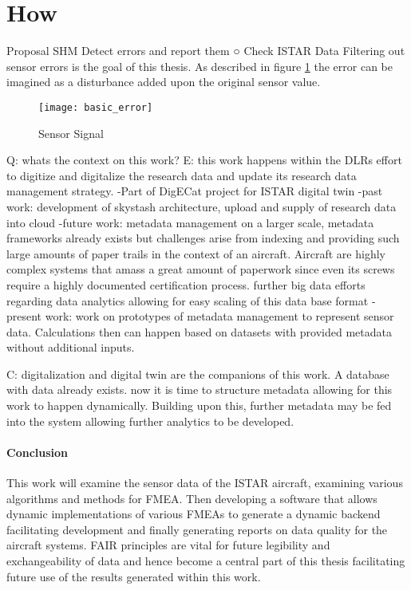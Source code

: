\section{How}
		 Proposal SHM
		 Detect errors and report them
		○ Check ISTAR Data
Filtering out sensor errors is the goal of this thesis. As described in figure \ref{fig:basic_error} the error can be imagined as a disturbance added upon the original sensor value.



\begin{figure}[ht]
	\centering
	\texttt{[image: basic\_error]}
	\caption{Sensor Signal}
	\label{fig:basic_error}
\end{figure}

Q: whats the context on this work?
E: this work happens within the DLRs effort to digitize and digitalize the research data and update its research data management strategy.
-Part of DigECat project for ISTAR digital twin
-past work: development of skystash architecture, upload and supply of research data into cloud
-future work: metadata management on a larger scale, metadata frameworks already exists but challenges arise from indexing and providing such large amounts of paper trails in the context of an aircraft. Aircraft are highly complex systems that amass a great amount of paperwork since even its screws require a highly documented certification process.
further big data efforts regarding data analytics allowing for easy scaling of this data base format
-present work: work on prototypes of metadata management to represent sensor data. Calculations then can happen based on datasets with provided metadata without additional inputs.

C: digitalization and digital twin are the companions of this work. A database with data already exists. now it is time to structure metadata allowing for this work to happen dynamically. Building upon this, further metadata may be fed into the system allowing further analytics to be developed.


\paragraph{Conclusion}

This work will examine the sensor data of the ISTAR aircraft, examining various algorithms and methods for FMEA. Then developing a software that allows dynamic implementations of various FMEAs to generate a dynamic backend facilitating development and finally generating reports on data quality for the aircraft systems. FAIR principles are vital for future legibility and exchangeability of data and hence become a central part of this thesis facilitating future use of the results generated within this work.